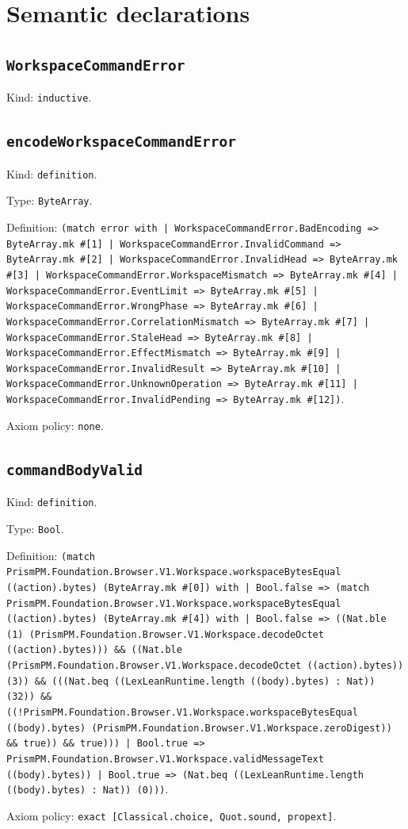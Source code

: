 \documentclass[11pt]{article}
\begin{document}
\section*{Semantic declarations}
\subsection*{\texttt{WorkspaceCommandError}}
\noindent Kind: \texttt{inductive}.\par
\subsection*{\texttt{encodeWorkspaceCommandError}}
\noindent Kind: \texttt{definition}.\par
\noindent Type: \texttt{ByteArray}.\par
\noindent Definition: \texttt{(match error with | WorkspaceCommandError.BadEncoding => ByteArray.mk \#[1] | WorkspaceCommandError.InvalidCommand => ByteArray.mk \#[2] | WorkspaceCommandError.InvalidHead => ByteArray.mk \#[3] | WorkspaceCommandError.WorkspaceMismatch => ByteArray.mk \#[4] | WorkspaceCommandError.EventLimit => ByteArray.mk \#[5] | WorkspaceCommandError.WrongPhase => ByteArray.mk \#[6] | WorkspaceCommandError.CorrelationMismatch => ByteArray.mk \#[7] | WorkspaceCommandError.StaleHead => ByteArray.mk \#[8] | WorkspaceCommandError.EffectMismatch => ByteArray.mk \#[9] | WorkspaceCommandError.InvalidResult => ByteArray.mk \#[10] | WorkspaceCommandError.UnknownOperation => ByteArray.mk \#[11] | WorkspaceCommandError.InvalidPending => ByteArray.mk \#[12])}.\par
\noindent Axiom policy: \texttt{none}.\par
\subsection*{\texttt{commandBodyValid}}
\noindent Kind: \texttt{definition}.\par
\noindent Type: \texttt{Bool}.\par
\noindent Definition: \texttt{(match PrismPM.Foundation.Browser.V1.Workspace.workspaceBytesEqual ((action).bytes) (ByteArray.mk \#[0]) with | Bool.false => (match PrismPM.Foundation.Browser.V1.Workspace.workspaceBytesEqual ((action).bytes) (ByteArray.mk \#[4]) with | Bool.false => ((Nat.ble (1) (PrismPM.Foundation.Browser.V1.Workspace.decodeOctet ((action).bytes))) \&\& ((Nat.ble (PrismPM.Foundation.Browser.V1.Workspace.decodeOctet ((action).bytes)) (3)) \&\& (((Nat.beq ((LexLeanRuntime.length ((body).bytes) : Nat)) (32)) \&\& ((!PrismPM.Foundation.Browser.V1.Workspace.workspaceBytesEqual ((body).bytes) (PrismPM.Foundation.Browser.V1.Workspace.zeroDigest)) \&\& true)) \&\& true))) | Bool.true => PrismPM.Foundation.Browser.V1.Workspace.validMessageText ((body).bytes)) | Bool.true => (Nat.beq ((LexLeanRuntime.length ((body).bytes) : Nat)) (0)))}.\par
\noindent Axiom policy: \texttt{exact [Classical.choice, Quot.sound, propext]}.\par
\end{document}
